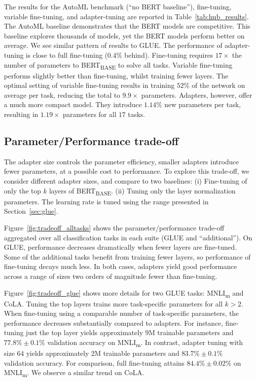 The results for the AutoML benchmark (``no BERT baseline''), fine-tuning, variable fine-tuning, and adapter-tuning are reported in Table~\ref{tab:hub_results}.
The AutoML baseline demonstrates that the BERT models are competitive. This baseline explores thousands of models, yet the BERT models perform better on average. We see similar pattern of results to GLUE. The performance of adapter-tuning is close to full fine-tuning ($0.4\%$ behind). Fine-tuning requires $17\times$ the number of parameters to BERT\textsubscript{BASE} to solve all tasks. Variable fine-tuning performs slightly better than fine-tuning, whilst training fewer layers. The optimal setting of variable fine-tuning results in training $52\%$ of the network on average per task, reducing the total to $9.9\times$ parameters. Adapters, however, offer a much more compact model. They introduce $1.14\%$ new parameters per task, resulting in $1.19\times$ parameters for all $17$ tasks.

\subsection{Parameter/Performance trade-off\label{sec:param_efficiency}}

The adapter size controls the parameter efficiency, smaller adapters introduce fewer parameters, at a possible cost to performance. To explore this trade-off, we consider different adapter sizes, and compare to two baselines: (i) Fine-tuning of only the top $k$ layers of BERT\textsubscript{BASE}.
(ii) Tuning only the layer normalization parameters. The learning rate is tuned using the range presented in Section~\ref{sec:glue}.

Figure~\ref{fig:tradeoff_alltasks} shows the parameter/performance trade-off aggregated over all classification tasks in each suite (GLUE and ``additional''). On GLUE, performance decreases dramatically when fewer layers are fine-tuned. Some of the additional tasks benefit from training fewer layers, so performance of fine-tuning decays much less. In both cases, adapters yield good performance across a range of sizes two orders of magnitude fewer than fine-tuning.

Figure~\ref{fig:tradeoff_glue} shows more details for two GLUE tasks: MNLI\textsubscript{m} and CoLA. Tuning the top layers trains more task-specific parameters for all $k>2$. When fine-tuning using a comparable number of task-specific parameters, the performance decreases substantially compared to adapters. For instance, fine-tuning just the top layer yields approximately $9$M trainable parameters and $77.8 \% \pm 0.1 \%$ validation accuracy on MNLI\textsubscript{m}.
In contrast, adapter tuning with size $64$ yields approximately $2$M trainable parameters and $83.7\% \pm 0.1 \%$  validation accuracy. For comparison, full fine-tuning attains $84.4 \% \pm 0.02 \%$ on MNLI\textsubscript{m}.
We observe a similar trend on CoLA.

